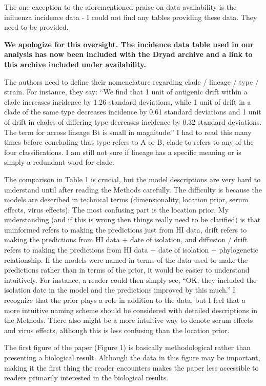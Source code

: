 \documentclass[11pt,oneside,letterpaper]{article}
\begin{document}
The one exception to the aforementioned praise on data availability is the influenza incidence data - I could not find any tables providing these data. They need to be provided.

\textbf{We apologize for this oversight.  The incidence data table used in our analysis has now been included with the Dryad archive and a link to this archive included under availability.}

The authors need to define their nomenclature regarding clade / lineage / type / strain. For instance, they say: ``We find that 1 unit of antigenic drift within a clade increases incidence by 1.26 standard deviations, while 1 unit of drift in a clade of the same type decreases incidence by 0.61 standard deviations and 1 unit of drift in clades of differing type decreases incidence by 0.32 standard deviations. The term for across lineage Bt is small in magnitude.'' I had to read this many times before concluding that type refers to A or B, clade to refers to any of the four classifications. I am still not sure if lineage has a specific meaning or is simply a redundant word for clade.

The comparison in Table 1 is crucial, but the model descriptions are very hard to understand until after reading the Methods carefully. The difficulty is because the models are described in technical terms (dimensionality, location prior, serum effects, virus effects). The most confusing part is the location prior. My understanding (and if this is wrong then things really need to be clarified) is that uninformed refers to making the predictions just from HI data, drift refers to making the predictions from HI data + date of isolation, and diffusion / drift refers to making the predictions from HI data + date of isolation + phylogenetic relationship. If the models were named in terms of the data used to make the predictions rather than in terms of the prior, it would be easier to understand intuitively. For instance, a reader could then simply see, ``OK, they included the isolation date in the model and the predictions improved by this much.'' I recognize that the prior plays a role in addition to the data, but I feel that a more intuitive naming scheme should be considered with detailed descriptions in the Methods. There also might be a more intuitive way to denote serum effects and virus effects, although this is less confusing than the location prior.

The first figure of the paper (Figure 1) is basically methodological rather than presenting a biological result. Although the data in this figure may be important, making it the first thing the reader encounters makes the paper less accessible to readers primarily interested in the biological results.
\end{document}

